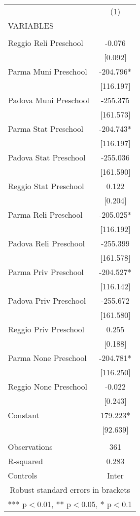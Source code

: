 \begin{tabular}{lc} \hline
 & (1) \\
VARIABLES &  \\ \hline
 &  \\
Reggio Reli Preschool & -0.076 \\
 & [0.092] \\
Parma Muni Preschool & -204.796* \\
 & [116.197] \\
Padova Muni Preschool & -255.375 \\
 & [161.573] \\
Parma Stat Preschool & -204.743* \\
 & [116.197] \\
Padova Stat Preschool & -255.036 \\
 & [161.590] \\
Reggio Stat Preschool & 0.122 \\
 & [0.204] \\
Parma Reli Preschool & -205.025* \\
 & [116.192] \\
Padova Reli Preschool & -255.399 \\
 & [161.578] \\
Parma Priv Preschool & -204.527* \\
 & [116.142] \\
Padova Priv Preschool & -255.672 \\
 & [161.580] \\
Reggio Priv Preschool & 0.255 \\
 & [0.188] \\
Parma None Preschool & -204.781* \\
 & [116.250] \\
Reggio None Preschool & -0.022 \\
 & [0.243] \\
Constant & 179.223* \\
 & [92.639] \\
 &  \\
Observations & 361 \\
R-squared & 0.283 \\
 Controls & Inter \\ \hline
\multicolumn{2}{c}{ Robust standard errors in brackets} \\
\multicolumn{2}{c}{ *** p$<$0.01, ** p$<$0.05, * p$<$0.1} \\
\end{tabular}
